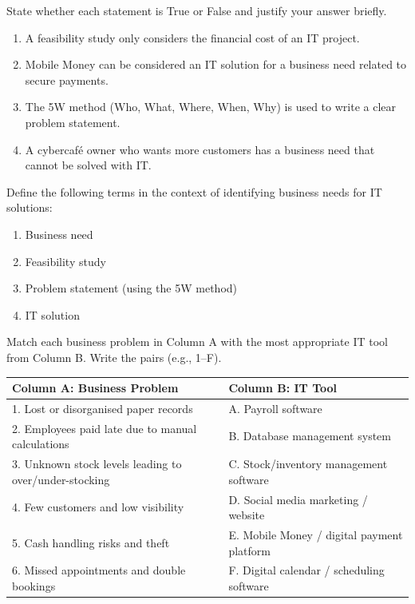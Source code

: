 \documentclass[11pt]{article}
\begin{document}
\begin{exercice}
State whether each statement is True or False and justify your answer briefly.
\begin{enumerate}
\item A feasibility study only considers the financial cost of an IT project.
\item Mobile Money can be considered an IT solution for a business need related to secure payments.
\item The 5W method (Who, What, Where, When, Why) is used to write a clear problem statement.
\item A cybercafé owner who wants more customers has a business need that cannot be solved with IT.
\end{enumerate}
\end{exercice}

\begin{exercice}[Definitions]
Define the following terms in the context of identifying business needs for IT solutions:
\begin{enumerate}
\item Business need
\item Feasibility study
\item Problem statement (using the 5W method)
\item IT solution
\end{enumerate}
\end{exercice}

\begin{exercice}
Match each business problem in Column A with the most appropriate IT tool from Column B. Write the pairs (e.g., 1--F).

\begin{center}
\begin{tabularx}{\linewidth}{|l|X|}\hline
\textbf{Column A: Business Problem} & \textbf{Column B: IT Tool} \\ \hline
1. Lost or disorganised paper records & A. Payroll software \\ \hline
2. Employees paid late due to manual calculations & B. Database management system \\ \hline
3. Unknown stock levels leading to over/under-stocking & C. Stock/inventory management software \\ \hline
4. Few customers and low visibility & D. Social media marketing / website \\ \hline
5. Cash handling risks and theft & E. Mobile Money / digital payment platform \\ \hline
6. Missed appointments and double bookings & F. Digital calendar / scheduling software \\ \hline
\end{tabularx}
\end{center}
\end{exercice}
\end{document}
